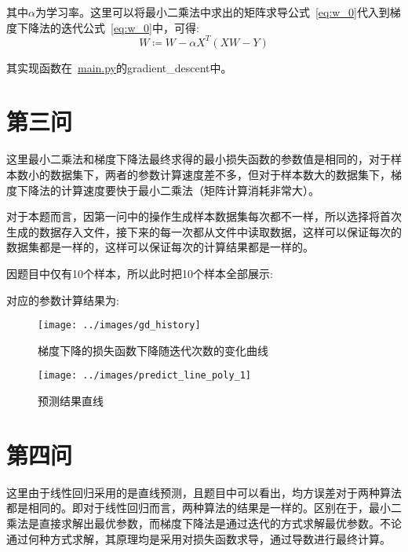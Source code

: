 \documentclass[UTF8]{article} %
\begin{document}
    其中$\alpha$为学习率。这里可以将最小二乘法中求出的矩阵求导公式~\eqref{eq:w_0}代入到梯度下降法的迭代公式~\eqref{eq:w_0}中，可得:
    \begin{equation}
        W \coloneqq W - \alpha X^T (X W - Y) \label{eq:w_3}
    \end{equation}

    其实现函数在~\href{run:main.py}{main.py}的gradient\_descent中。


    \section{第三问}
    这里最小二乘法和梯度下降法最终求得的最小损失函数的参数值是相同的，对于样本数小的数据集下，两者的参数计算速度差不多，但对于样本数大的数据集下，梯度下降法的计算速度要快于最小二乘法（矩阵计算消耗非常大）。

    对于本题而言，因第一问中的操作生成样本数据集每次都不一样，所以选择将首次生成的数据存入文件，接下来的每一次都从文件中读取数据，这样可以保证每次的数据集都是一样的，这样可以保证每次的计算结果都是一样的。

    因题目中仅有10个样本，所以此时把10个样本全部展示:

    

    对应的参数计算结果为:
    

    \begin{figure}[H]
        \begin{minipage}[b]{0.5\linewidth}
            \centering
            \texttt{[image: ../images/gd\_history]}
            \caption{梯度下降的损失函数下降随迭代次数的变化曲线}
            \label{fig:gd_history}
        \end{minipage}
        \begin{minipage}[b]{0.5\linewidth}
            \centering
            \texttt{[image: ../images/predict\_line\_poly\_1]}
            \caption{预测结果直线}
            \label{fig:pd_line}
        \end{minipage}
    \end{figure}


    \section{第四问}
    这里由于线性回归采用的是直线预测，且题目中可以看出，均方误差对于两种算法都是相同的。即对于线性回归而言，两种算法的结果是一样的。区别在于，最小二乘法是直接求解出最优参数，而梯度下降法是通过迭代的方式求解最优参数。不论通过何种方式求解，其原理均是采用对损失函数求导，通过导数进行最终计算。
\end{document}
